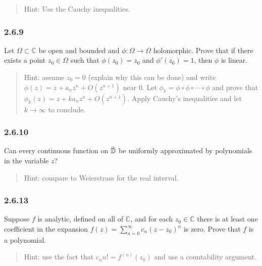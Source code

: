 \begin{quote}
Hint: Use the Cauchy inequalities.
\end{quote}

\hypertarget{section-38}{%
\subsubsection{2.6.9}\label{section-38}}

Let \(\Omega \subset {\mathbb{C}}\) be open and bounded and
\(\phi: \Omega \to \Omega\) holomorphic. Prove that if there exists a
point \(z_0 \in \Omega\) such that \(\phi(z_0) = z_0\) and
\(\phi'(z_0) = 1\), then \(\phi\) is linear.

\begin{quote}
Hint: assume \(z_0 = 0\) (explain why this can be done) and write
\(\phi(z) = z + a_n z^n + O(z^{n+1})\) near \(0\). Let
\(\phi_k = \phi \circ \phi \circ \cdots \circ \phi\) and prove that
\(\phi_k(z) = z + ka_nz^n + O(z^{n+1})\). Apply Cauchy's inequalities
and let \(k\to \infty\) to conclude.
\end{quote}

\hypertarget{section-39}{%
\subsubsection{2.6.10}\label{section-39}}

Can every continuous function on
\(\mkern 1.5mu\overline{\mkern-1.5mu{\mathbb{D}}\mkern-1.5mu}\mkern 1.5mu\)
be uniformly approximated by polynomials in the variable \(z\)?

\begin{quote}
Hint: compare to Weierstrass for the real interval.
\end{quote}

\hypertarget{section-40}{%
\subsubsection{2.6.13}\label{section-40}}

Suppose \(f\) is analytic, defined on all of \({\mathbb{C}}\), and for
each \(z_0 \in {\mathbb{C}}\) there is at least one coefficient in the
expansion \(f(z) = \sum_{n=0}^\infty c_n(z-z_0)^n\) is zero. Prove that
\(f\) is a polynomial.

\begin{quote}
Hint: use the fact that \(c_n n! = f^{(n)}(z_0)\) and use a countability
argument.
\end{quote}

